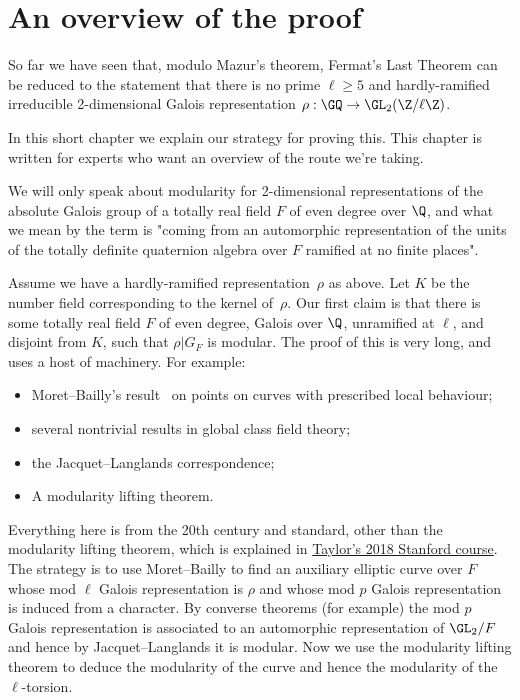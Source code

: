 \chapter{An overview of the proof}\label{ch_overview}

So far we have seen that, modulo Mazur's theorem, Fermat's Last Theorem can be reduced
to the statement that there is no prime $\ell\geq 5$ and hardly-ramified
irreducible 2-dimensional Galois representation $\rho:\GQ\to\GL_2(\Z/\ell\Z)$.

In this short chapter we explain our strategy for proving this. This chapter is written
for experts who want an overview of the route we're taking.

We will only speak about modularity for 2-dimensional representations of the
absolute Galois group of a totally real field $F$ of even degree over $\Q$, and
what we mean by the term is "coming from an automorphic representation of the
units of the totally definite quaternion algebra over $F$ ramified at no finite places".

Assume we have a hardly-ramified representation~$\rho$ as above. Let $K$
be the number field corresponding to the kernel of~$\rho$. Our first claim
is that there is some totally real field $F$ of even degree, Galois over $\Q$,
unramified at $\ell$, and disjoint from $K$, such that $\rho|G_F$ is modular. 
The proof of this is very long, and uses a host of machinery. For example:
\begin{itemize}
    \item Moret--Bailly's result~\cite{moret-bailly} on points on curves with prescribed 
    local behaviour;
    \item several nontrivial results in global class field theory;
    \item the Jacquet--Langlands correspondence;
    \item A modularity lifting theorem.
\end{itemize}

Everything here is from the 20th century and standard, other than the modularity
lifting theorem, which is explained in \href{https://math.berkeley.edu/~fengt/249A_2018.pdf}
{Taylor's 2018 Stanford course}. The strategy is to use Moret--Bailly to find an auxiliary 
elliptic curve over $F$ whose mod $\ell$ Galois representation is $\rho$ and whose
mod $p$ Galois representation is induced from a character. By converse theorems (for example)
the mod $p$ Galois representation is associated to an automorphic representation of
$\GL_2/F$ and hence by Jacquet--Langlands it is modular. Now we use the
modularity lifting theorem to deduce the modularity of the curve and hence
the modularity of the $\ell$-torsion. 

